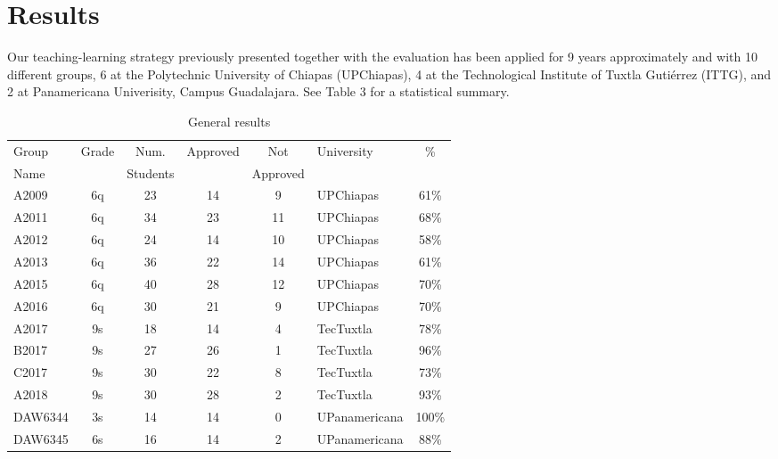\section{Results}
\label{sec:results}
Our teaching-learning strategy previously presented together with the evaluation  
has been applied for 9 years approximately and with 10 different groups, 
6 at the Polytechnic University of Chiapas (UPChiapas), 4 at the Technological 
Institute of Tuxtla Guti\'errez (ITTG), and 
2 at Panamericana Univerisity, Campus Guadalajara. 
See Table 3 for a statistical summary.

\begin{table}[htb]
    \begin{center}
        \caption{General results}
        \label{table:results}
        \begin{tabular}{|l|c|c|c|c|l|c|}
      \hline
      Group	 &Grade&Num.    &Approved&Not     &University      & \% \\
      Name	 &     &Students&        &Approved&	               &    \\\hline
      A2009	 &6q   &23      &14      &9       &UPChiapas	   &61\%\\	\hline
      A2011  &6q   &34      &23      &11      &UPChiapas	   &68\%\\	\hline
      A2012  &6q   &24      &14      &10      &UPChiapas	   &58\%\\	\hline
      A2013  &6q   &36      &22      &14      &UPChiapas	   &61\%\\	\hline
      A2015  &6q   &40      &28      &12      &UPChiapas	   &70\%\\	\hline
      A2016  &6q   &30      &21      &9       &UPChiapas	   &70\%\\	\hline
      A2017	 &9s   &18      &14      &4       &TecTuxtla	   &78\%\\	\hline
      B2017	 &9s   &27      &26      &1       &TecTuxtla	   &96\%\\	\hline
      C2017	 &9s   &30      &22      &8       &TecTuxtla	   &73\%\\	\hline
      A2018	 &9s   &30      &28      &2       &TecTuxtla	   &93\%\\	\hline
      DAW6344&3s   &14      &14      &0       &UPanamericana   &100\%\\	\hline
      DAW6345&6s   &16      &14      &2       &UPanamericana   &88\% \\	\hline
        \end{tabular}
    \end{center}
\end{table}

